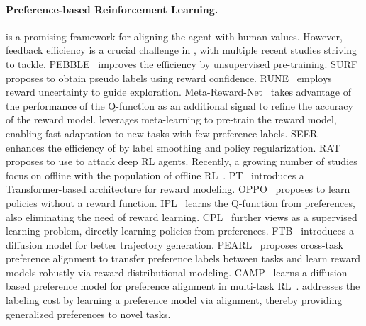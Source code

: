 \paragraph{Preference-based Reinforcement Learning.}

\PbRL is a promising framework for aligning the agent with human values. However, feedback efficiency is a crucial challenge in \pbRL, with multiple recent studies striving to tackle. PEBBLE~\citep{PEBBLE} improves the efficiency by unsupervised pre-training. SURF~\citep{SURF} proposes to obtain pseudo labels using reward confidence. RUNE~\citep{RUNE} employs reward uncertainty to guide exploration. Meta-Reward-Net~\citep{Meta-Reward-Net} takes advantage of the performance of the Q-function as an additional signal to refine the accuracy of the reward model. \citet{hejna2023few} leverages meta-learning to pre-train the reward model, enabling fast adaptation to new tasks with few preference labels. SEER~\citep{SEER} enhances the efficiency of \pbRL by label smoothing and policy regularization. RAT~\citep{RAT} proposes to use \pbRL to attack deep RL agents.
Recently, a growing number of studies focus on offline \pbRL with the population of offline RL~\citep{levine2020offline, IQL, SEABO, OTDF}.
PT~\citep{PT} introduces a Transformer-based architecture for reward modeling. OPPO~\citep{OPPO} proposes to learn policies without a reward function. IPL~\citep{IPL} learns the Q-function from preferences, also eliminating the need of reward learning. CPL~\citep{CPL} further views \pbRL as a supervised learning problem, directly learning policies from preferences. FTB~\citep{FTB} introduces a diffusion model for better trajectory generation. PEARL~\citep{PEARL} proposes cross-task preference alignment to transfer preference labels between tasks and learn reward models robustly via reward distributional modeling. CAMP~\citep{CAMP} learns a diffusion-based preference model for preference alignment in multi-task RL~\citep{PiCor}.
\ourmethod addresses the labeling cost by learning a \vl preference model via \vl alignment, thereby providing generalized preferences to novel tasks.